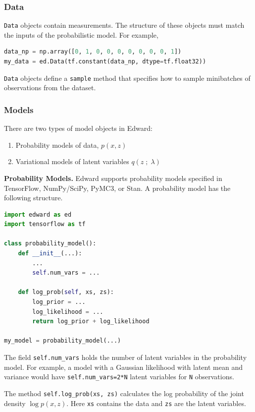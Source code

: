 \subsubsection{Data}

\texttt{Data} objects contain measurements. The structure of these objects must
match the inputs of the probabilistic model. For example, 

\begin{lstlisting}[language=Python]
data_np = np.array([0, 1, 0, 0, 0, 0, 0, 0, 0, 1])
my_data = ed.Data(tf.constant(data_np, dtype=tf.float32))
\end{lstlisting}

\texttt{Data} objects define a \texttt{sample} method that specifies how to
sample minibatches of observations from the dataset.

\subsubsection{Models}\label{models}

There are two types of model objects in Edward:
\begin{enumerate}
\item Probability models of data, $p(x,z)$
\item Variational models of latent variables $q(z\;;\;\lambda)$
\end{enumerate}

\textbf{Probability Models.}
Edward supports probability models specified in TensorFlow, NumPy/SciPy, PyMC3,
or Stan. A probability model has the following structure.
\begin{lstlisting}[language=Python]
import edward as ed
import tensorflow as tf

class probability_model():
    def __init__(...):
        ...
        self.num_vars = ...
 
    def log_prob(self, xs, zs):
        log_prior = ...
        log_likelihood = ...
        return log_prior + log_likelihood

my_model = probability_model(...)
\end{lstlisting}
The field \texttt{self.num\_vars} holds the number of latent variables in the
probability model. For example, a model with a Gaussian likelihood with latent
mean and variance would have \texttt{self.num\_vars=2*N} latent variables for 
\texttt{N} observations.

The method \texttt{self.log_prob(xs, zs)} calculates the log probability of the
joint density $\log p(x,z)$. Here \texttt{xs} contains the data and \texttt{zs}
are the latent variables.

